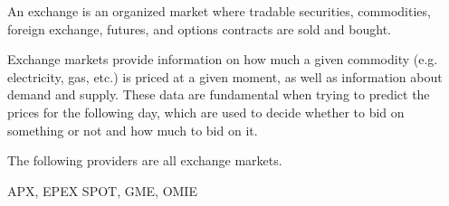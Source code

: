 An exchange is an organized market where tradable securities, commodities, foreign exchange, futures, and options contracts are sold and bought. \cite{bib:wikipedia:exchange}

Exchange markets provide information on how much a given commodity (e.g. electricity, gas, etc.) is priced at a given moment, as well as information about demand and supply.
These data are fundamental when trying to predict the prices for the following day, which are used to decide whether to bid on something or not and how much to bid on it.\newline

The following providers are all exchange markets.

APX, EPEX SPOT, GME, OMIE
